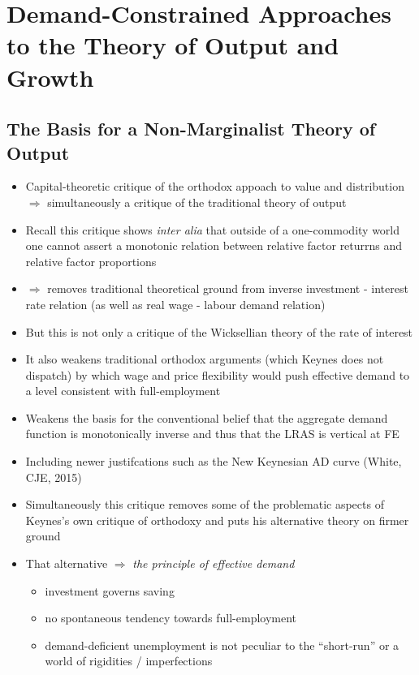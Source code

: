 \documentclass{article}
\begin{document}
\section{Demand-Constrained Approaches to the Theory of Output and Growth}
\subsection{The Basis for a Non-Marginalist Theory of Output}
	\begin{itemize}
		\item  Capital-theoretic critique of the orthodox appoach to value and distribution \( \Rightarrow \) simultaneously a critique of the traditional theory of output
		\item Recall this critique shows \textit{inter alia} that outside of a one-commodity world one cannot assert a monotonic relation between relative factor returrns and relative factor proportions
		\item \( \Rightarrow \) removes traditional theoretical ground from inverse investment - interest rate relation (as well as real wage - labour demand relation)
		\item But this is not only a critique of the Wicksellian theory of the rate of interest
		\item It also weakens traditional orthodox arguments (which Keynes does not dispatch) by which wage and price flexibility would push effective demand to a level consistent with full-employment
		\item Weakens the basis for the conventional belief that the aggregate demand function is monotonically inverse and thus that the LRAS is vertical at FE
		\item  Including newer justifcations such as the New Keynesian AD curve (White, CJE, 2015)
		\item Simultaneously this critique removes some of the problematic aspects of Keynes's own critique of orthodoxy and puts his alternative theory on firmer ground
		\item That alternative \( \Rightarrow \) \textit{the principle of effective demand}
		\begin{itemize}
			\item investment governs saving
			\item no spontaneous tendency towards full-employment
			\item demand-deficient unemployment is not peculiar to the ``short-run'' or a world of rigidities / imperfections
		\end{itemize}
	\end{itemize}
\end{document}
